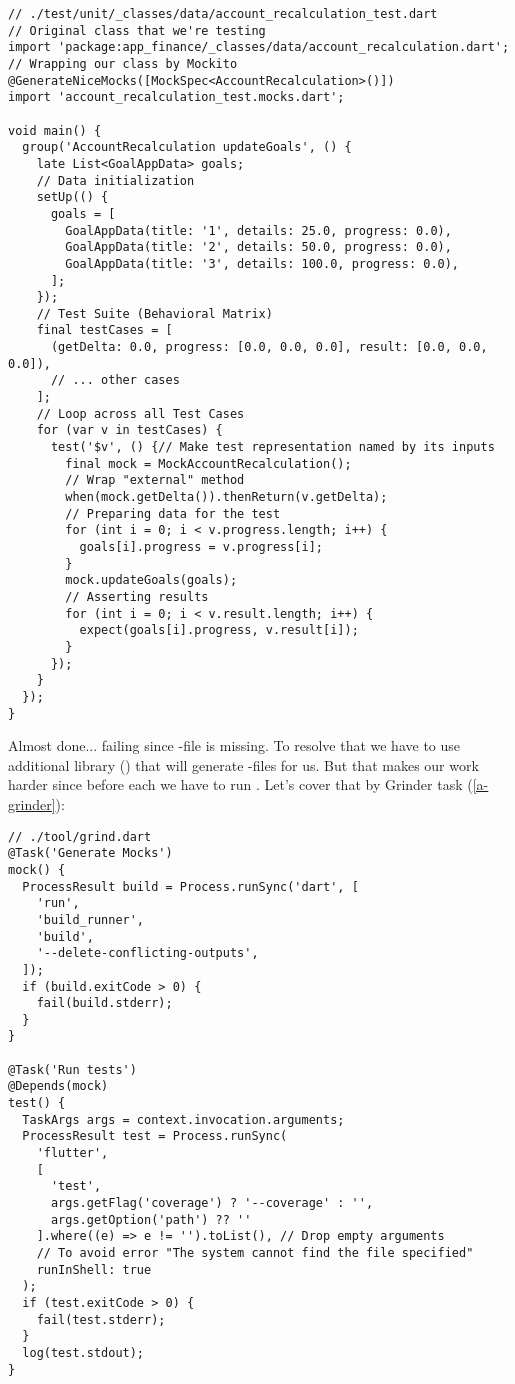 \begin{lstlisting}
// ./test/unit/_classes/data/account_recalculation_test.dart
// Original class that we're testing
import 'package:app_finance/_classes/data/account_recalculation.dart';
// Wrapping our class by Mockito
@GenerateNiceMocks([MockSpec<AccountRecalculation>()])
import 'account_recalculation_test.mocks.dart';

void main() {
  group('AccountRecalculation updateGoals', () {
    late List<GoalAppData> goals;
    // Data initialization
    setUp(() {
      goals = [
        GoalAppData(title: '1', details: 25.0, progress: 0.0),
        GoalAppData(title: '2', details: 50.0, progress: 0.0),
        GoalAppData(title: '3', details: 100.0, progress: 0.0),
      ];
    });
    // Test Suite (Behavioral Matrix)
    final testCases = [
      (getDelta: 0.0, progress: [0.0, 0.0, 0.0], result: [0.0, 0.0, 0.0]),
      // ... other cases
    ];
    // Loop across all Test Cases
    for (var v in testCases) {
      test('$v', () {// Make test representation named by its inputs
        final mock = MockAccountRecalculation();
        // Wrap "external" method
        when(mock.getDelta()).thenReturn(v.getDelta);
        // Preparing data for the test
        for (int i = 0; i < v.progress.length; i++) {
          goals[i].progress = v.progress[i];
        }
        mock.updateGoals(goals);
        // Asserting results
        for (int i = 0; i < v.result.length; i++) {
          expect(goals[i].progress, v.result[i]);
        }
      });
    }
  });
}
\end{lstlisting}

\noindent Almost done... failing since -file is missing. To resolve that we 
have to use additional library  () that will generate 
-files for us. But that makes our work harder since before each  we have to run 
. Let's cover that by Grinder task (\ref{a-grinder}):

\begin{lstlisting}
// ./tool/grind.dart
@Task('Generate Mocks')
mock() {
  ProcessResult build = Process.runSync('dart', [
    'run',
    'build_runner',
    'build',
    '--delete-conflicting-outputs',
  ]);
  if (build.exitCode > 0) {
    fail(build.stderr);
  }
}

@Task('Run tests')
@Depends(mock)
test() {
  TaskArgs args = context.invocation.arguments;
  ProcessResult test = Process.runSync(
    'flutter', 
    [
      'test',
      args.getFlag('coverage') ? '--coverage' : '',
      args.getOption('path') ?? ''
    ].where((e) => e != '').toList(), // Drop empty arguments
    // To avoid error "The system cannot find the file specified"
    runInShell: true
  );
  if (test.exitCode > 0) {
    fail(test.stderr);
  }
  log(test.stdout);
}
\end{lstlisting}

